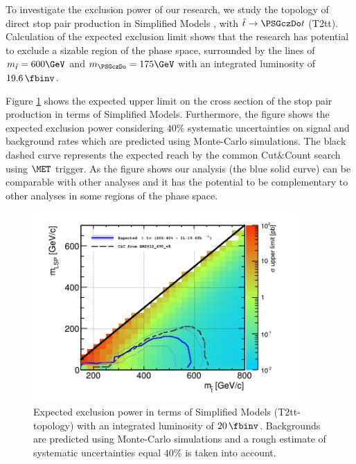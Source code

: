 To investigate the exclusion power of our research, we study the topology of direct stop pair production  in Simplified Models \cite{alves:sms}, with $\tilde{t}\to \PSGczDo t$ (T2tt). 
Calculation of the expected exclusion limit shows that  
the research has potential to exclude 
a sizable region of the phase space, surrounded by the lines of $m_{\tilde{t}} = 600\GeV$ and $m_{\PSGczDo} = 175\GeV$ with an integrated luminosity of $19.6\,\fbinv$.



Figure \ref{fig:limit_20inf} shows the expected upper limit on the cross section of the stop pair production in terms of Simplified Models. 
Furthermore, the figure shows the expected exclusion power considering 
$40\%$ systematic uncertainties on signal and background rates which are predicted using Monte-Carlo simulations. The black 
dashed curve represents the expected reach by the common Cut$\&$Count \cite{cutandcountAN} search using $\MET$ trigger. 
As the figure shows our analysis (the blue solid curve) can be comparable with other analyses and   
it has the potential to be complementary to other analyses in some regions of the phase space.  



\begin{linenomath}
\begin{figure}[h]
\centering
\includegraphics[width=0.9\textwidth,keepaspectratio=true]{StatisticsFig/Exc_131030_196ifb.png}
\caption{Expected exclusion power in terms of Simplified Models (T2tt-topology) with an integrated luminosity of $20\,\fbinv$. Backgrounds are predicted using Monte-Carlo simulations and a rough estimate of systematic uncertainties equal 
$40\%$ is taken into account.}
\label{fig:limit_20inf}
\end{figure}
\end{linenomath}


